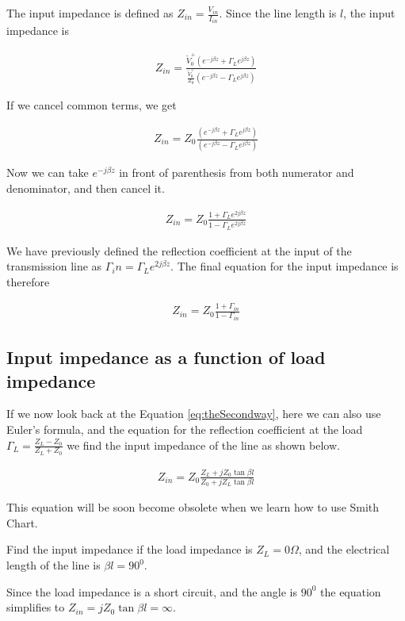 \documentclass{ximera}
\begin{document}
The input impedance is defined as $Z_{in}=\frac{V_{in}}{I_{in}}$. Since the line length is $l$, the input impedance is





\begin{eqnarray}
Z_{in}=\frac{\tilde{V}_0^+ (e^{-j \beta z} + \Gamma_L  e^{j \beta z }  )}{\frac{\tilde{V}_0^+}{Z_0}  (e^{-j \beta z} - \Gamma_L  e^{j \beta z}  )}
\end{eqnarray}

If we cancel common terms, we get

\begin{eqnarray}
Z_{in}=Z_0 \frac{(e^{-j \beta z} + \Gamma_L  e^{j \beta z }  )}{  (e^{-j \beta z} - \Gamma_L  e^{j \beta z}  )} \label{eq:theSecondway}
\end{eqnarray}

Now we can take $e^{-j \beta z}$ in front of parenthesis from both numerator and denominator, and then cancel it.


\begin{eqnarray}
Z_{in}=Z_0 \frac{1 + \Gamma_L  e^{ 2j \beta z }  }{  1 - \Gamma_L  e^{2j \beta z}  }
\end{eqnarray}

We have previously defined the reflection coefficient at the input of the transmission line as $\Gamma_in=\Gamma_L  e^{ 2j \beta z }$. The final equation for the input impedance is therefore




\begin{eqnarray}
Z_{in}=Z_0 \frac{1 + \Gamma_{in}  }{  1 - \Gamma_{in}  }
\end{eqnarray}

\subsection{Input impedance as a function of load impedance}

If we now look back at the Equation \ref{eq:theSecondway}, here we can also  use Euler's formula, and the equation for the reflection coefficient at the load $\Gamma_L = \frac{Z_L-Z_0}{Z_L+Z_0}$ we find the input impedance of the line as shown below.


\begin{eqnarray}
Z_{in}= Z_0 \frac{Z_L+ j Z_0 \tan \beta l}{Z_0+ j Z_L \tan \beta l} 
\end{eqnarray}

This equation will be soon become obsolete when we learn how to use Smith Chart.

\begin{example}

Find the input impedance if the load impedance is $Z_L=0 \Omega$, and the electrical length of the line is $\beta l = 90^0$.

\begin{explanation}
Since the load impedance is a short circuit, and the angle is $90^0$ the equation simplifies to $Z_{in}=  j Z_0 \tan \beta l = \infty$.
\end{explanation}

\end{example}
\end{document}
